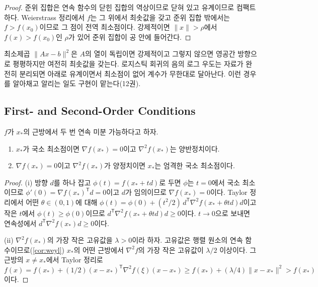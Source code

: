 \begin{proof}
준위 집합은 연속 함수의 닫힌 집합의 역상이므로 닫혀 있고 유계이므로 컴팩트하다. Weierstrass 정리에서 $f$는 그 위에서 최솟값을 갖고 준위 집합 밖에서는 $f>f(x_0)$이므로 그 점이 전역 최소점이다. 강제적이면 $\|x\|>\rho$에서 $f(x)>f(x_0)$인 $\rho$가 있어 준위 집합이 공 안에 들어간다.
\end{proof}

최소제곱 $\|Ax-b\|^2$은 $A$의 열이 독립이면 강제적이고 그렇지 않으면 영공간 방향으로 평평하지만 여전히 최솟값을 갖는다. 로지스틱 회귀의 음의 로그 우도는 자료가 완전히 분리되면 아래로 유계이면서 최소점이 없어 계수가 무한대로 달아난다. 이런 경우를 알아채고 알리는 일도 구현이 맡는다(12권).

\subsection{First- and Second-Order Conditions}

\begin{theorem}
\label{thm:optimality}
$f$가 $x_\ast$의 근방에서 두 번 연속 미분 가능하다고 하자.
\begin{enumerate}
\item $x_\ast$가 국소 최소점이면 $\nabla f(x_\ast)=0$이고 $\nabla^2f(x_\ast)$는 양반정치이다.
\item $\nabla f(x_\ast)=0$이고 $\nabla^2f(x_\ast)$가 양정치이면 $x_\ast$는 엄격한 국소 최소점이다.
\end{enumerate}
\end{theorem}

\begin{proof}
(i) 방향 $d$를 하나 잡고 $\phi(t)=f(x_\ast+td)$로 두면 $\phi$는 $t=0$에서 국소 최소이므로 $\phi'(0)=\nabla f(x_\ast)^{\mathsf T}d=0$이고 $d$가 임의이므로 $\nabla f(x_\ast)=0$이다. Taylor 정리에서 어떤 $\theta\in(0,1)$에 대해 $\phi(t)=\phi(0)+(t^2/2)\,d^{\mathsf T}\nabla^2f(x_\ast+\theta td)d$이고 작은 $t$에서 $\phi(t)\ge\phi(0)$이므로 $d^{\mathsf T}\nabla^2f(x_\ast+\theta td)d\ge0$이다. $t\to0$으로 보내면 연속성에서 $d^{\mathsf T}\nabla^2f(x_\ast)d\ge0$이다.

(ii) $\nabla^2f(x_\ast)$의 가장 작은 고유값을 $\lambda>0$이라 하자. 고유값은 행렬 원소의 연속 함수이므로(\cref{cor:weyl}) $x_\ast$의 어떤 근방에서 $\nabla^2f$의 가장 작은 고유값이 $\lambda/2$ 이상이다. 그 근방의 $x\ne x_\ast$에서 Taylor 정리로 $f(x)=f(x_\ast)+(1/2)(x-x_\ast)^{\mathsf T}\nabla^2f(\xi)(x-x_\ast)\ge f(x_\ast)+(\lambda/4)\|x-x_\ast\|^2>f(x_\ast)$이다.
\end{proof}

